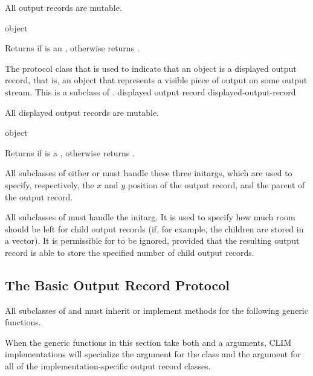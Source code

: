 All output records are mutable.

 {object}

Returns  if  is an , otherwise
returns .


The protocol class that is used to indicate that an object is a displayed output
record, that is, an object that represents a visible piece of output on
some output stream.  This is a subclass of .
 {displayed output record} {displayed-output-record}

All displayed output records are mutable.

 {object}

Returns  if  is a ,
otherwise returns .


All subclasses of either  or  must
handle these three initargs, which are used to specify, respectively, the $x$
and $y$ position of the output record, and the parent of the output record.


All subclasses of  must handle the  initarg.  It is
used to specify how much room should be left for child output records (if, for
example, the children are stored in a vector).  It is permissible for 
to be ignored, provided that the resulting output record is able to store the
specified number of child output records.


\subsection {The Basic Output Record Protocol}

All subclasses of  and  must
inherit or implement methods for the following generic functions.

When the generic functions in this section take both  and a
 arguments, CLIM implementations will specialize the 
argument for the  class and the
 argument for all of the implementation-specific output record
classes.

